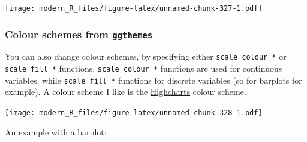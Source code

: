 \documentclass[]{gitbook}
\newenvironment{Shaded}{\begin{snugshade}}{\end{snugshade}}
\newcommand{\DataTypeTok}[1]{\textcolor[rgb]{0.13,0.29,0.53}{#1}}
\newcommand{\KeywordTok}[1]{\textcolor[rgb]{0.13,0.29,0.53}{\textbf{#1}}}
\newcommand{\NormalTok}[1]{#1}
\newcommand{\OperatorTok}[1]{\textcolor[rgb]{0.81,0.36,0.00}{\textbf{#1}}}
\newcommand{\StringTok}[1]{\textcolor[rgb]{0.31,0.60,0.02}{#1}}
\theoremstyle{definition}
\theoremstyle{definition}
\theoremstyle{definition}
\theoremstyle{remark}
\begin{document}
\texttt{[image: modern\_R\_files/figure-latex/unnamed-chunk-327-1.pdf]}

\hypertarget{colour-schemes-from-ggthemes}{%
\subsubsection{\texorpdfstring{Colour schemes from
\texttt{ggthemes}}{Colour schemes from ggthemes}}\label{colour-schemes-from-ggthemes}}

You can also change colour schemes, by specifying either
\texttt{scale\_colour\_*} or \texttt{scale\_fill\_*} functions.
\texttt{scale\_colour\_*} functions are used for continuous variables,
while \texttt{scale\_fill\_*} functions for discrete variables (so for
barplots for example). A colour scheme I like is the
\href{https://www.highcharts.com/}{Highcharts} colour scheme.

\begin{Shaded}
\end{Shaded}

\texttt{[image: modern\_R\_files/figure-latex/unnamed-chunk-328-1.pdf]}

An example with a barplot:
\end{document}
